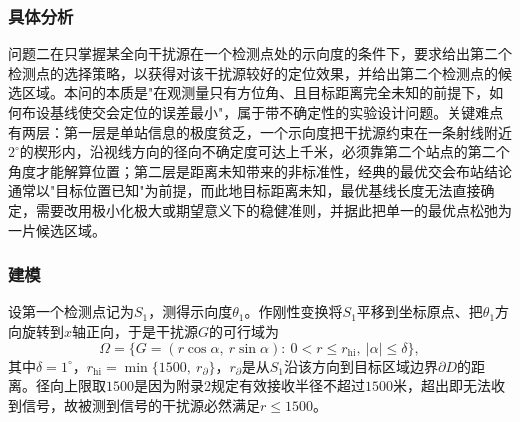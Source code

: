 \documentclass[12pt,a4paper]{ctexart}
\begin{document}
\subsubsection{具体分析}

问题二在只掌握某全向干扰源在一个检测点处的示向度的条件下，要求给出第二个检测点的选择策略，以获得对该干扰源较好的定位效果，并给出第二个检测点的候选区域。本问的本质是"在观测量只有方位角、且目标距离完全未知的前提下，如何布设基线使交会定位的误差最小"，属于带不确定性的实验设计问题。关键难点有两层：第一层是单站信息的极度贫乏，一个示向度把干扰源约束在一条射线附近$2^\circ$的楔形内，沿视线方向的径向不确定度可达上千米，必须靠第二个站点的第二个角度才能解算位置；第二层是距离未知带来的非标准性，经典的最优交会布站结论通常以"目标位置已知"为前提，而此地目标距离未知，最优基线长度无法直接确定，需要改用极小化极大或期望意义下的稳健准则，并据此把单一的最优点松弛为一片候选区域。

\subsubsection{建模}

设第一个检测点记为$S_1$，测得示向度$\theta_1$。作刚性变换将$S_1$平移到坐标原点、把$\theta_1$方向旋转到$x$轴正向，于是干扰源$G$的可行域为
\begin{equation}
\Omega=\bigl\{G=(r\cos\alpha,\ r\sin\alpha):\ 0<r\le r_{\mathrm{hi}},\ \lvert\alpha\rvert\le\delta\bigr\},
\label{eq:omega}
\end{equation}
其中$\delta=1^\circ$，$r_{\mathrm{hi}}=\min\{1500,\ r_{\partial}\}$，$r_{\partial}$是从$S_1$沿该方向到目标区域边界$\partial D$的距离。径向上限取$1500$是因为附录2规定有效接收半径不超过$1500$米，超出即无法收到信号，故被测到信号的干扰源必然满足$r\le1500$。
\end{document}
